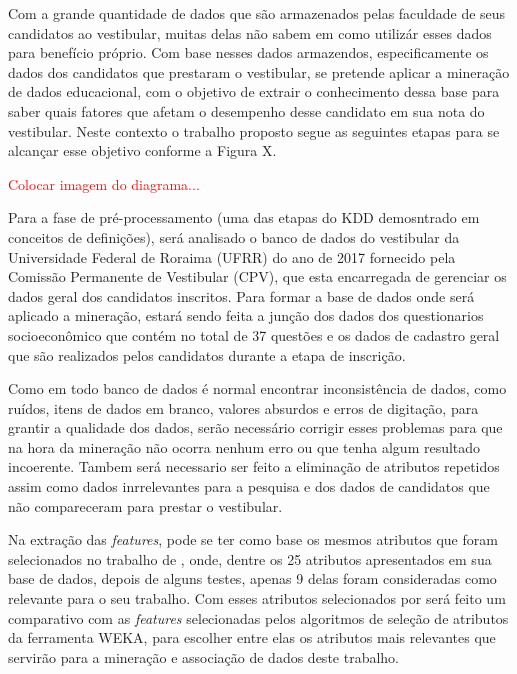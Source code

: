 \label{chapter:metodo}

\par
Com a grande quantidade de dados que são armazenados pelas faculdade de seus candidatos ao vestibular, muitas delas não sabem em como utilizár esses dados para benefício próprio. Com base nesses dados armazendos, especificamente os dados dos candidatos que prestaram o vestibular, se pretende aplicar a mineração de dados educacional, com o objetivo de extrair o conhecimento dessa base para saber quais fatores que afetam o desempenho desse candidato em sua nota do vestibular. Neste contexto o trabalho proposto segue as seguintes etapas para se alcançar esse objetivo conforme a Figura X.

\par
\textcolor{red}{Colocar imagem do diagrama...}

\par
Para a fase de pré-processamento (uma das etapas do KDD demosntrado em conceitos de definições), será analisado o banco de dados do vestibular da Universidade Federal de Roraima (UFRR) do ano de 2017 fornecido pela Comissão Permanente de Vestibular (CPV), que esta encarregada de gerenciar os dados geral dos candidatos inscritos. Para formar a base de dados onde será aplicado a mineração, estará sendo feita a junção dos dados dos questionarios socioeconômico que contém no total de 37 questões e os dados de cadastro geral que são realizados pelos candidatos durante a etapa de inscrição.


\par
Como em todo banco de dados é normal encontrar inconsistência de dados, como ruídos, itens de dados em branco, valores absurdos e erros de digitação, para grantir a qualidade dos dados, serão necessário corrigir esses problemas para que na hora da mineração não ocorra nenhum erro ou que tenha algum resultado incoerente. Tambem será necessario ser feito a eliminação de atributos repetidos assim como dados inrrelevantes para a pesquisa e dos dados de candidatos que não compareceram para prestar o vestibular.

\par
Na extração das \textit{features}, pode se ter como base os mesmos atributos que foram selecionados no trabalho de , onde, dentre os 25 atributos apresentados em sua base de dados, depois de alguns testes, apenas 9 delas foram consideradas como relevante para o seu trabalho. Com esses atributos selecionados por  será feito um comparativo com as \textit{features} selecionadas pelos algoritmos de seleção de atributos da ferramenta WEKA, para escolher entre elas os atributos mais relevantes que servirão para a mineração e associação de dados deste trabalho.


